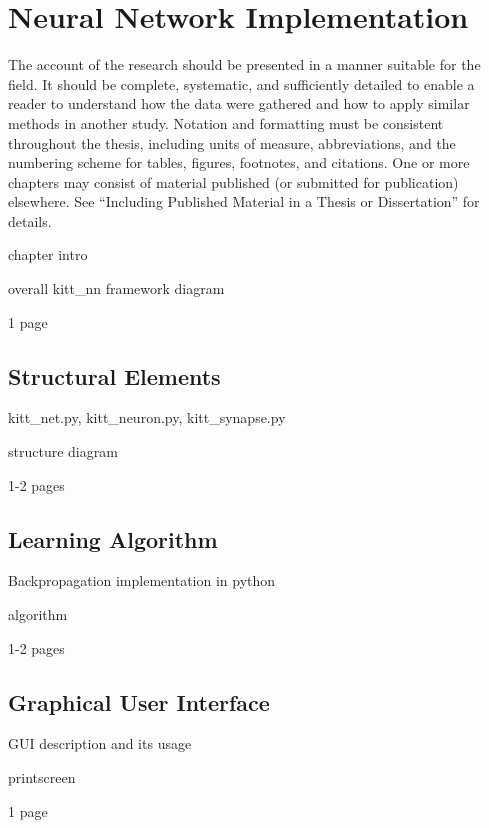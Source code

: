 \chapter{Neural Network Implementation}
\label{chapter:04:neural_net_implementation}

The account of the research should be presented in a manner suitable for the field. It should be complete, systematic, and sufficiently detailed to enable a reader to understand how the data were gathered and how to apply similar methods in another study. Notation and formatting must be consistent throughout the thesis, including units of measure, abbreviations, and the numbering scheme for tables, figures, footnotes, and citations. One or more chapters may consist of material published (or submitted for publication) elsewhere. See “Including Published Material in a Thesis or Dissertation” for details.

chapter intro

overall kitt\_nn framework diagram

1 page

\section{Structural Elements}
kitt\_net.py, kitt\_neuron.py, kitt\_synapse.py

structure diagram

1-2 pages

\section{Learning Algorithm} \label{sec:learning_algorithm}
Backpropagation implementation in python

algorithm

1-2 pages

\section{Graphical User Interface}
GUI description and its usage

printscreen

1 page